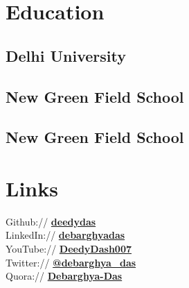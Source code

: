 \documentclass[letterpaper]{deedy-resume} %
\begin{document}
\begin{minipage}[t]{0.33\textwidth} %


\section{Education} 

\subsection{Delhi University}

\sectionspace %

\subsection{New Green Field School}

\sectionspace %


\subsection{New Green Field School}

\sectionspace %


\section{Links} 

Github:// \href{https://github.com/deedydas}{\bf deedydas} \\
LinkedIn:// \href{https://www.linkedin.com/in/debarghyadas}{\bf debarghyadas} \\
YouTube:// \href{https://www.youtube.com/user/DeedyDash007}{\bf DeedyDash007} \\
Twitter:// \href{https://twitter.com/debarghya_das}{\bf @debarghya\_das} \\
Quora:// \href{https://www.quora.com/Debarghya-Das}{\bf Debarghya-Das}


\end{minipage}
\end{document}
